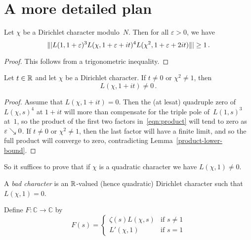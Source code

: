 \section{A more detailed plan}

\begin{lemma} \label{product-lower-bound}
  \leanok
  Let $\chi$ be a Dirichlet character modulo~$N$. Then for all $\varepsilon > 0$, we have
  \begin{equation} \label {eqn:product}
    \||L(1, 1 + \varepsilon)^3 L(\chi, 1 + \varepsilon + it)^4 L(\chi^2, 1 + \varepsilon + 2it)\|| \ge 1 \,.
  \end{equation}
\end{lemma}

\begin{proof}
  \leanok
  This follows from a trigonometric inequality.
\end{proof}

\begin{lemma} \label{non-quadratic}
  Let $t \in \mathbb{R}$ and let $\chi$ be a Dirichlet character. If $t \ne 0$ or $\chi^2 \ne 1$, then
  \[ L(\chi, 1 + it) \ne 0 \,. \]
\end{lemma}

\begin{proof}
  Assume that $L(\chi, 1 + it) = 0$. Then the (at lesat) quadruple zero of~$L(\chi, s)^4$ at $1 + it$
  will more than compensate for the triple pole of~$L(1, s)^3$ at~$1$, so the product of the first
  two factors in~\eqref{eqn:product} will tend to zero as $\varepsilon \searrow 0$.
  If $t \ne 0$ or $\chi^2 \ne 1$, then the last factor will have a finite limit, and so the
  full product will converge to zero, contradicting Lemma~\ref{product-lower-bound}.
\end{proof}


 So it suffices to prove that if $\chi$ is a quadratic character we have $L(\chi, 1) \ne 0$.

 \begin{definition}
  \leanok
  A \emph{bad character} is an $\mathbb{R}$-valued (hence quadratic) Dirichlet character such that $L(\chi, 1) = 0$.
 \end{definition}

 \begin{definition}
  \leanok
  Define $F : \mathbb{C} \to \mathbb{C}$ by
  \[ F(s) = \begin{cases}
   \zeta(s) L(\chi, s) & \text{if $s \ne 1$} \\
   L'(\chi, 1) & \text{if $s = 1$}
   \end{cases}
  \]
 \end{definition}


